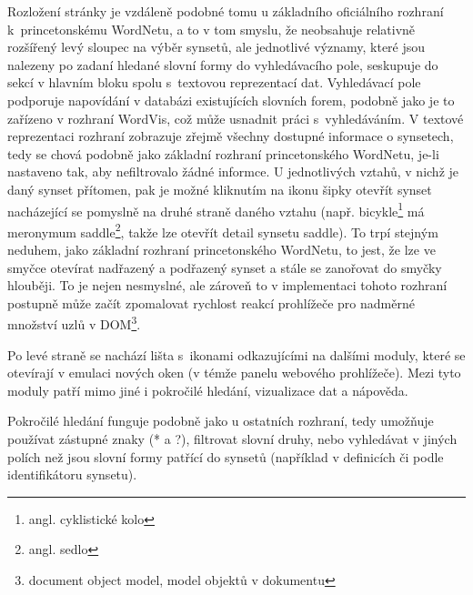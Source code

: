 \documentclass[a4paper, 11pt, oneside, showtrims]{book}
\newcommand\ex{\textsf}
\begin{document}
					Rozložení stránky je vzdáleně podobné tomu u základního oficiálního rozhraní k~princetonskému WordNetu, a to v tom smyslu, že neobsahuje relativně rozšířený levý sloupec na výběr synsetů, ale jednotlivé významy, které jsou nalezeny po zadaní hledané slovní formy do vyhledávacího pole, seskupuje do sekcí v hlavním bloku spolu s~textovou reprezentací dat. Vyhledávací pole podporuje napovídání v databázi existujících slovních forem, podobně jako je to zařízeno v rozhraní WordVis, což může usnadnit práci s~vyhledáváním. V textové reprezentaci rozhraní zobrazuje zřejmě všechny dostupné informace o synsetech, tedy se chová podobně jako základní rozhraní princetonského WordNetu, je-li nastaveno tak, aby nefiltrovalo žádné informce. U jednotlivých vztahů, v nichž je daný synset přítomen, pak je možné kliknutím na ikonu šipky otevřít synset nacházející se pomyslně na druhé straně daného vztahu (např. \ex{bicykle}\footnote{angl. \ex{cyklistické kolo}} má meronymum \ex{saddle}\footnote{angl. \ex{sedlo}}, takže lze otevřít detail synsetu \ex{saddle}). To trpí stejným neduhem, jako základní rozhraní princetonského WordNetu, to jest, že lze ve smyčce otevírat nadřazený a podřazený synset a stále se zanořovat do smyčky hlouběji. To je nejen nesmyslné, ale zároveň to v implementaci tohoto rozhraní postupně může začít zpomalovat rychlost reakcí prohlížeče pro nadměrné množství uzlů v DOM\footnote{document object model, model objektů v dokumentu}.

					Po levé straně se nachází lišta s~ikonami odkazujícími na dalšími moduly, které se otevírají v emulaci nových oken (v témže panelu webového prohlížeče). Mezi tyto moduly patří mimo jiné i pokročilé hledání, vizualizace dat a nápověda. 

					Pokročilé hledání funguje podobně jako u ostatních rozhraní, tedy umožňuje používat zástupné znaky (\ex{*} a \ex{?}), filtrovat slovní druhy, nebo vyhledávat v jiných polích než jsou slovní formy patřící do synsetů (například v definicích či podle identifikátoru synsetu). 
\end{document}
